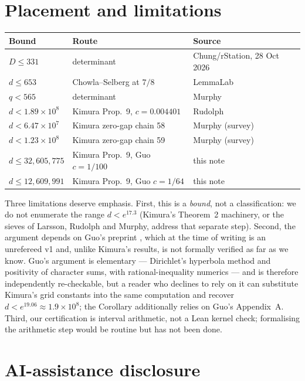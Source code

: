 \documentclass[11pt]{article}
\begin{document}
\section{Placement and limitations}

\begin{center}
\begin{tabular}{lll}
\toprule
Bound & Route & Source \\
\midrule
$D \le 331$ & determinant & Chung/rStation, 28 Oct 2026 \\
$d \le 653$ & Chowla--Selberg at $7/8$ & LemmaLab \\
$q < 565$ & determinant & Murphy \\
$d < 1.89\times 10^8$ & Kimura Prop.~9, $c = 0.004401$ & Rudolph \\
$d < 6.47\times 10^7$ & Kimura zero-gap chain 58 & Murphy (survey) \\
$d < 1.23\times 10^8$ & Kimura zero-gap chain 59 & Murphy (survey) \\
$d \le 32{,}605{,}775$ & Kimura Prop.~9, Guo $c = 1/100$ & this note \\
$d \le 12{,}609{,}991$ & Kimura Prop.~9, Guo $c = 1/64$ & this note \\
\bottomrule
\end{tabular}
\end{center}

Three limitations deserve emphasis. First, this is a \emph{bound}, not a
classification: we do not enumerate the range $d < e^{17.3}$ (Kimura's
Theorem~2 machinery, or the sieves of Larsson, Rudolph and Murphy, address
that separate step). Second, the argument depends on Guo's preprint
\cite{guo}, which at the time of writing is an unrefereed v1 and, unlike
Kimura's results, is not formally verified as far as we know. Guo's
argument is elementary --- Dirichlet's hyperbola method and positivity of
character sums, with rational-inequality numerics --- and is therefore
independently re-checkable, but a reader who declines to rely on it can
substitute Kimura's grid constants into the same computation and recover
$d < e^{19.06} \approx 1.9\times 10^8$; the Corollary additionally relies
on Guo's Appendix~A. Third, our certification is interval arithmetic, not
a Lean kernel check; formalising the arithmetic step would be routine
but has not been done.

\section*{AI-assistance disclosure}
\end{document}
